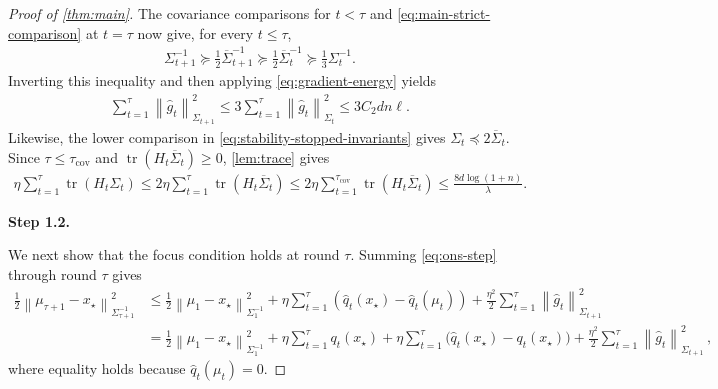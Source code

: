 \documentclass[11pt]{article}
\newcommand{\proofstepinline}[1]{%
    {\sffamily\bfseries\color{blue!55!black}Step #1.}\enspace
}
\newcommand{\tr}{\operatorname{tr}}
\newcommand{\1}{\mathbf 1}
\newcommand{\normm}[2]{\left\lVert #1\right\rVert_{#2}}
\begin{document}
\begin{proof}[Proof of \cref{thm:main}]
    The covariance comparisons for $t<\tau$ and
    \eqref{eq:main-strict-comparison} at $t=\tau$ now give, for every
    $t\leq\tau$,
    \begin{align}
        \Sigma_{t+1}^{-1}
        \succeq
        \frac12\overline\Sigma_{t+1}^{-1}
        \succeq
        \frac12\overline\Sigma_t^{-1}
        \succeq
        \frac13\Sigma_t^{-1}.
    \end{align}
    Inverting this inequality and then applying \eqref{eq:gradient-energy}
    yields
    \begin{align}
        \sum_{t=1}^{\tau}
        \normm{\widehat g_t}{\Sigma_{t+1}}^2
        \leq
        3\sum_{t=1}^{\tau}
        \normm{\widehat g_t}{\Sigma_t}^2
        \leq 3C_2dn\ell.
        \label{eq:main-next-gradient-energy}
    \end{align}
    Likewise, the lower comparison in
    \eqref{eq:stability-stopped-invariants} gives
    $\Sigma_t\preceq2\overline\Sigma_t$.  Since
    $\tau\leq\tau_{\mathrm{cov}}$ and
    $\tr(H_t\overline\Sigma_t)\geq0$, \cref{lem:trace} gives
    \begin{align}
        \eta\sum_{t=1}^{\tau}\tr(H_t\Sigma_t)
        \leq
        2\eta\sum_{t=1}^{\tau}
        \tr(H_t\overline\Sigma_t)
        \leq
        2\eta\sum_{t=1}^{\tau_{\mathrm{cov}}}
        \tr(H_t\overline\Sigma_t)
        \leq\frac{8d\log(1+n)}{\lambda}.
        \label{eq:main-stability-trace}
    \end{align}

    \proofstepinline{1.2}
    We next show that the focus condition holds at round $\tau$.
    Summing \eqref{eq:ons-step} through round $\tau$ gives
    \begin{align}
        \frac12
        \normm{\mu_{\tau+1}-x_\star}{\Sigma_{\tau+1}^{-1}}^2
         & \leq
        \frac12\normm{\mu_1-x_\star}{\Sigma_1^{-1}}^2
        +\eta\sum_{t=1}^{\tau}
        \left(
        \widehat q_t(x_\star)
        -
        \widehat q_t(\mu_t)
        \right)
        +\frac{\eta^2}{2}\sum_{t=1}^{\tau}
        \normm{\widehat g_t}{\Sigma_{t+1}}^2
        \\
         & =
        \frac12\normm{\mu_1-x_\star}{\Sigma_1^{-1}}^2
        +\eta\sum_{t=1}^{\tau}q_t(x_\star)
        +\eta\sum_{t=1}^{\tau}
        \bigl(\widehat q_t(x_\star)-q_t(x_\star)\bigr)
        +\frac{\eta^2}{2}\sum_{t=1}^{\tau}
        \normm{\widehat g_t}{\Sigma_{t+1}}^2\,,
        \label{eq:main-focus-decomposition}
    \end{align}
    where equality holds because $\widehat q_t(\mu_t)=0$.


\end{proof}
\end{document}
